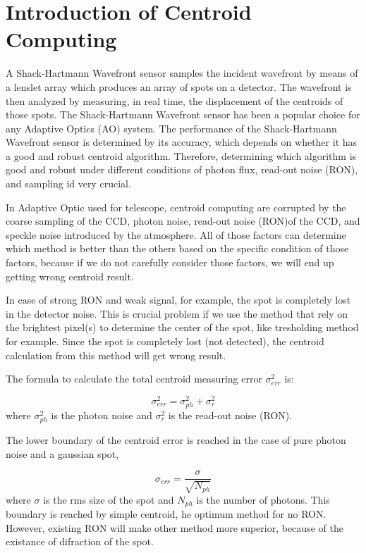 \documentclass{article}
\begin{document}
\section{Introduction of Centroid Computing}

A Shack-Hartmann Wavefront sensor samples the incident wavefront by means of a lenslet array which produces an array of spots on a detector. The wavefront is then analyzed by measuring, in real time, the displacement of the centroids of those spots. The Shack-Hartmann Wavefront sensor has been a popular choice for any Adaptive Optics (AO) system. The performance of the Shack-Hartmann Wavefront sensor is determined by its accuracy, which depends on whether it has a good and robust centroid algorithm. Therefore, determining which algorithm is good and robust under different conditions of photon flux, read-out noise (RON), and sampling id very crucial.

In Adaptive Optic used for telescope, centroid computing are corrupted by the coarse sampling of the CCD, photon noise, read-out noise (RON)of the CCD, and speckle noise introduced by the atmosphere. All of those factors can determine which method is better than the others based on the specific condition of those factors, because if we do not carefully consider those factors, we will end up getting wrong centroid result.

In case of strong RON and weak signal, for example, the spot is completely lost in the detector noise. This is crucial problem if we use the method that rely on the brightest pixel(s) to determine the center of the spot, like tresholding method for example. Since the spot is completely lost (not detected), the centroid calculation from this method will get wrong result.

The formula to calculate the total centroid measuring error $\sigma_{err}^2$ is:

\begin{equation}
\sigma_{err}^2 =\sigma_{ph}^2+\sigma_r^2
\end{equation}
where $\sigma_{ph}^2$ is the photon noise and $\sigma_{r}^2$ is the read-out noise (RON).

The lower boundary of the centroid error is reached in the case of pure photon noise and a gaussian spot,

\begin{equation}
\sigma_{err} = \frac{\sigma}{\sqrt{N_{ph}}}
\end{equation}
where $\sigma$ is the rms size of the spot and $N_{ph}$ is the number of photons. This boundary is reached by simple centroid, he optimum method for no RON. However, existing RON will make other method more superior, because of the existance of difraction of the spot.
\end{document}
